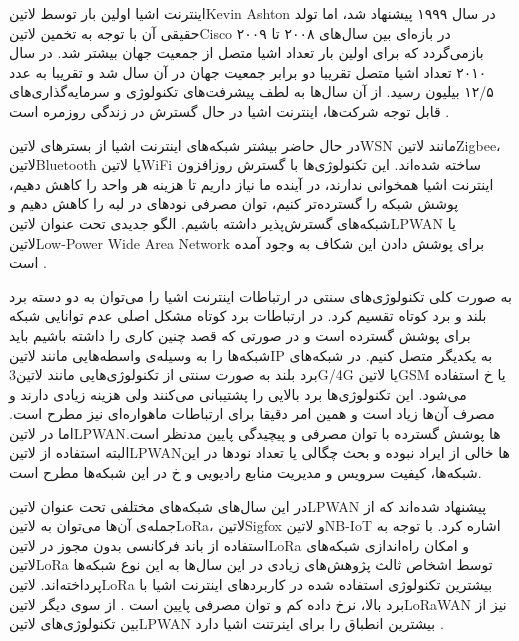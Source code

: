 
اینترنت اشیا اولین بار توسط ‌لاتین{Kevin Ashton} در سال ۱۹۹۹ پیشنهاد شد، اما تولد حقیقی آن
با توجه به تخمین ‌لاتین{Cisco} در بازه‌ای بین سال‌های ۲۰۰۸ تا ۲۰۰۹ بازمی‌گردد که برای اولین بار تعداد اشیا
متصل از جمعیت جهان بیشتر شد. در سال ۲۰۱۰ تعداد اشیا متصل تقریبا دو برابر جمعیت جهان در آن سال شد و تقریبا به عدد ۱۲/۵ بیلیون رسید.
از آن سال‌ها به لطف پیشرفت‌های تکنولوژی و سرمایه‌گذاری‌های قابل توجه شرکت‌ها، اینترنت اشیا در حال گسترش در زندگی روزمره است
.

در حال حاضر بیشتر شبکه‌های اینترنت اشیا از بسترهای ‌لاتین{WSN} مانند ‌لاتین{Zigbee}، ‌لاتین{Bluetooth} یا ‌لاتین{WiFi} ساخته شده‌اند.
این تکنولوژی‌ها با گسترش روزافزون اینترنت اشیا همخوانی ندارند، در آینده ما نیاز داریم تا هزینه هر واحد را کاهش دهیم، پوشش شبکه را گسترده‌تر کنیم، توان مصرفی نودهای در لبه را کاهش دهیم و شبکه‌های گسترش‌پذیر داشته باشیم.
الگو جدیدی تحت عنوان ‌لاتین{LPWAN} یا ‌لاتین{Low-Power Wide Area Network} برای پوشش دادن این شکاف به وجود آمده است .

به صورت کلی تکنولوژی‌های سنتی در ارتباطات اینترنت اشیا را می‌توان به دو دسته برد بلند و برد کوتاه تقسیم کرد. در ارتباطات برد کوتاه مشکل اصلی عدم توانایی شبکه برای پوشش گسترده است و در صورتی که قصد چنین کاری را داشته باشیم
باید شبکه‌ها را به وسیله‌ی واسطه‌هایی مانند ‌لاتین{IP} به یکدیگر متصل کنیم. در شبکه‌های برد بلند به صورت سنتی از تکنولوژی‌هایی مانند ‌لاتین{3G/4G} یا ‌لاتین{GSM} یا ‌خ استفاده می‌شود.
این تکنولوژی‌ها برد بالایی را پشتیبانی می‌کنند ولی هزینه زیادی دارند و مصرف آن‌ها زیاد است و همین امر دقیقا برای ارتباطات ماهواره‌ای نیز مطرح است. اما در ‌لاتین{LPWAN}ها پوشش گسترده با توان مصرفی و پیچیدگی پایین مدنظر است.
البته استفاده از ‌لاتین{LPWAN}ها خالی از ایراد نبوده و بحث چگالی یا تعداد نودها در این شبکه‌ها، کیفیت سرویس و مدیریت منابع رادیویی و ‌خ در این شبکه‌ها مطرح است.

در این سال‌های شبکه‌های مختلفی تحت عنوان ‌لاتین{LPWAN} پیشنهاد شده‌اند که از جمله‌ی آن‌ها می‌توان به ‌لاتین{LoRa}، ‌لاتین{Sigfox} و ‌لاتین{NB-IoT} اشاره کرد.
با توجه به استفاده از باند فرکانسی بدون مجوز در ‌لاتین{LoRa} و امکان راه‌اندازی شبکه‌های ‌لاتین{LoRa} توسط اشخاص ثالث پژوهش‌های زیادی در این سال‌ها به این نوع شبکه‌ها پرداخته‌اند.
‌لاتین{LoRa} بیشترین تکنولوژی استفاده شده در کاربردهای اینترنت اشیا با برد بالا، نرخ داده کم و توان مصرفی پایین است .
از سوی دیگر ‌لاتین{LoRaWAN} نیز از بین تکنولوژی‌های ‌لاتین{LPWAN} بیشترین انطباق را برای اینرتنت اشیا دارد .

